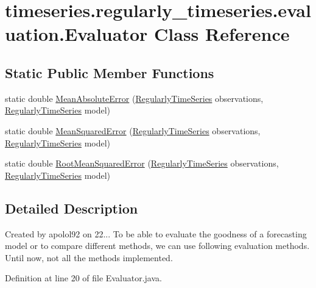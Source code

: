 \hypertarget{classtimeseries_1_1regularly__timeseries_1_1evaluation_1_1_evaluator}{}\section{timeseries.\+regularly\+\_\+timeseries.\+evaluation.\+Evaluator Class Reference}
\label{classtimeseries_1_1regularly__timeseries_1_1evaluation_1_1_evaluator}
\subsection*{Static Public Member Functions}
\begin{DoxyCompactItemize}
\item 
static double \hyperlink{classtimeseries_1_1regularly__timeseries_1_1evaluation_1_1_evaluator_ab62c8ddebe2d247d6bdebb035e07973d}{Mean\+Absolute\+Error} (\hyperlink{classtimeseries_1_1_regularly_time_series}{Regularly\+Time\+Series} observations, \hyperlink{classtimeseries_1_1_regularly_time_series}{Regularly\+Time\+Series} model)
\item 
static double \hyperlink{classtimeseries_1_1regularly__timeseries_1_1evaluation_1_1_evaluator_a5f4cf4fa6634cd640543e5ebc4b63348}{Mean\+Squared\+Error} (\hyperlink{classtimeseries_1_1_regularly_time_series}{Regularly\+Time\+Series} observations, \hyperlink{classtimeseries_1_1_regularly_time_series}{Regularly\+Time\+Series} model)
\item 
static double \hyperlink{classtimeseries_1_1regularly__timeseries_1_1evaluation_1_1_evaluator_a67882978c0911fe2621c8641ad1c13c3}{Root\+Mean\+Squared\+Error} (\hyperlink{classtimeseries_1_1_regularly_time_series}{Regularly\+Time\+Series} observations, \hyperlink{classtimeseries_1_1_regularly_time_series}{Regularly\+Time\+Series} model)
\end{DoxyCompactItemize}


\subsection{Detailed Description}
Created by apolol92 on 22... To be able to evaluate the goodness of a forecasting model or to compare different methods, we can use following evaluation methods. Until now, not all the methods implemented. 

Definition at line 20 of file Evaluator.\+java.



